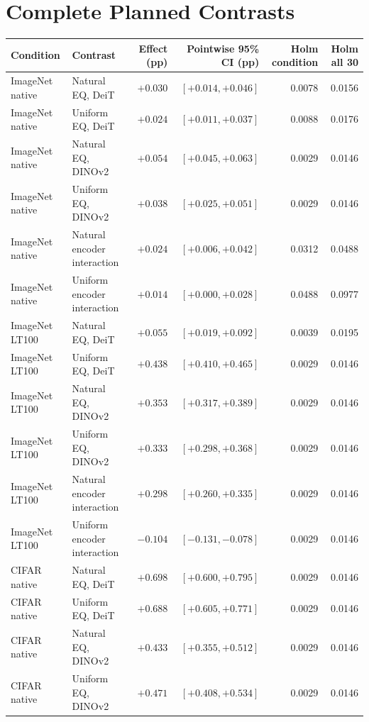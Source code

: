 \documentclass[conference]{IEEEtran}
\begin{document}
\section{Complete Planned Contrasts}
\label{app:contrasts}
\begin{center}\footnotesize
\begin{tabular}{llrrrr}
\toprule
Condition & Contrast & Effect (pp) & Pointwise 95\% CI (pp) & Holm condition & Holm all 30 \\
\midrule
ImageNet native & Natural EQ, DeiT & $+0.030$ & $[+0.014,+0.046]$ & 0.0078 & 0.0156 \\
ImageNet native & Uniform EQ, DeiT & $+0.024$ & $[+0.011,+0.037]$ & 0.0088 & 0.0176 \\
ImageNet native & Natural EQ, DINOv2 & $+0.054$ & $[+0.045,+0.063]$ & 0.0029 & 0.0146 \\
ImageNet native & Uniform EQ, DINOv2 & $+0.038$ & $[+0.025,+0.051]$ & 0.0029 & 0.0146 \\
ImageNet native & Natural encoder interaction & $+0.024$ & $[+0.006,+0.042]$ & 0.0312 & 0.0488 \\
ImageNet native & Uniform encoder interaction & $+0.014$ & $[+0.000,+0.028]$ & 0.0488 & 0.0977 \\
\addlinespace[3pt]
ImageNet LT100 & Natural EQ, DeiT & $+0.055$ & $[+0.019,+0.092]$ & 0.0039 & 0.0195 \\
ImageNet LT100 & Uniform EQ, DeiT & $+0.438$ & $[+0.410,+0.465]$ & 0.0029 & 0.0146 \\
ImageNet LT100 & Natural EQ, DINOv2 & $+0.353$ & $[+0.317,+0.389]$ & 0.0029 & 0.0146 \\
ImageNet LT100 & Uniform EQ, DINOv2 & $+0.333$ & $[+0.298,+0.368]$ & 0.0029 & 0.0146 \\
ImageNet LT100 & Natural encoder interaction & $+0.298$ & $[+0.260,+0.335]$ & 0.0029 & 0.0146 \\
ImageNet LT100 & Uniform encoder interaction & $-0.104$ & $[-0.131,-0.078]$ & 0.0029 & 0.0146 \\
\addlinespace[3pt]
CIFAR native & Natural EQ, DeiT & $+0.698$ & $[+0.600,+0.795]$ & 0.0029 & 0.0146 \\
CIFAR native & Uniform EQ, DeiT & $+0.688$ & $[+0.605,+0.771]$ & 0.0029 & 0.0146 \\
CIFAR native & Natural EQ, DINOv2 & $+0.433$ & $[+0.355,+0.512]$ & 0.0029 & 0.0146 \\
CIFAR native & Uniform EQ, DINOv2 & $+0.471$ & $[+0.408,+0.534]$ & 0.0029 & 0.0146 \\

\end{tabular}
\end{center}
\end{document}
